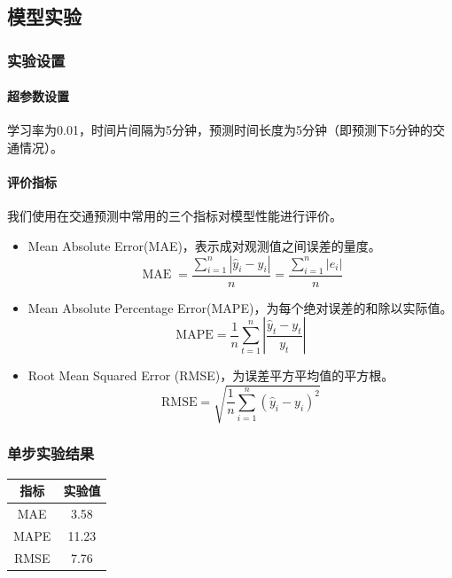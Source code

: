 \documentclass[UTF8]{ctexart}
\numberwithin{equation}{section}
\begin{document}
\subsection{模型实验}
\subsubsection{实验设置}
\paragraph{超参数设置}
学习率为0.01，时间片间隔为5分钟，预测时间长度为5分钟（即预测下5分钟的交通情况）。

\paragraph{评价指标}
我们使用在交通预测中常用的三个指标对模型性能进行评价。
\begin{itemize}
	\item Mean Absolute Error(MAE)，表示成对观测值之间误差的量度。
	$$\operatorname{MAE}=\frac{\sum_{i=1}^{n}\left|\hat y_{i}-y_{i}\right|}{n}=\frac{\sum_{i=1}^{n}\left|e_{i}\right|}{n}$$
	
	\item Mean Absolute Percentage Error(MAPE)，为每个绝对误差的和除以实际值。
	$$\mathrm{MAPE}=\frac{1}{n} \sum_{t=1}^{n}\left|\frac{\hat y_{t}-y_{t}}{y_{t}}\right|$$
	
	\item Root Mean Squared Error (RMSE)，为误差平方平均值的平方根。
	$$ \mathrm{RMSE}=\sqrt{\dfrac{1}{n}\sum_{i=1}^n(\hat y_i-y_i)^2}
	$$
	
\end{itemize}

\subsubsection{单步实验结果}
\begin{table}[H]
	\begin{center}
		\begin{tabular}{cc}
			\toprule[1.5pt]
			\multicolumn{1}{m{4cm}}{\centering 指标}
			&\multicolumn{1}{m{4cm}}{\centering 实验值}\\
			\midrule[1.0pt]
			MAE  & 3.58\\
			MAPE  & 11.23\\
			RMSE  & 7.76\\
			\bottomrule[1.5pt]
		\end{tabular}\label{tb:notation}
	\end{center}
\end{table}
\end{document}
